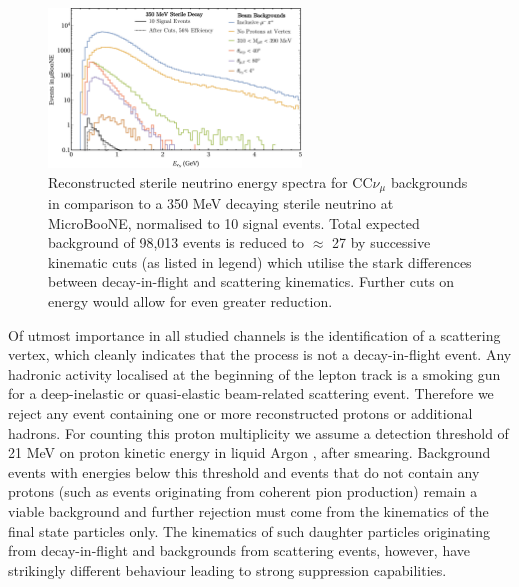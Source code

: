 \documentclass[11pt, a4paper]{article}
\def\muboone{MicroBooNE}
\begin{document}
\begin{figure}[t]
\center
\includegraphics[width=0.6\textwidth,clip,trim=0 0 0 0]{figures/mu_pi_cutflow.pdf}

\caption{\label{fig:mu_pi_cutflow} Reconstructed sterile neutrino energy spectra for
CC$\nu_\mu$ backgrounds in comparison to a 350 MeV decaying sterile neutrino at
\muboone, normalised to 10 signal events. Total expected background of 98,013
events is reduced to $\approx$ 27 by successive kinematic cuts (as listed in legend) which utilise
the stark differences between decay-in-flight and scattering kinematics. Further cuts on energy would allow for even greater reduction. }
\end{figure}

Of utmost importance in all studied channels is the identification of a
scattering vertex, which cleanly indicates that the process is not a
decay-in-flight event. Any hadronic activity localised at the beginning of the
lepton track is a smoking gun for a deep-inelastic or quasi-elastic
beam-related scattering event. Therefore we reject any event containing one or more
reconstructed protons or additional hadrons. For counting
this proton multiplicity we assume a detection threshold of 21 MeV on proton
kinetic energy in liquid Argon \cite{Acciarri:2014gev}, after smearing.
Background events with energies below this threshold and events that do not contain
any protons (such as events originating from coherent pion production) remain a
viable background and further rejection must come from the kinematics of the
final state particles only. The kinematics of such daughter particles
originating from decay-in-flight and backgrounds from scattering events,
however,  have strikingly different behaviour leading to strong suppression
capabilities.
\end{document}
